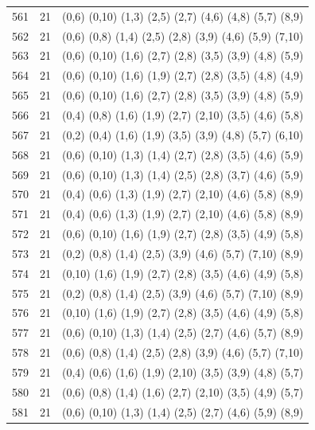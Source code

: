 \begin{appendix}
{\begin{longtable}{lll}
    561& 21 & (0,6)   (0,10)  (1,3)   (2,5)   (2,7)   (4,6)   (4,8)   (5,7)   (8,9)\\
    562& 21 & (0,6)   (0,8)   (1,4)   (2,5)   (2,8)   (3,9)   (4,6)   (5,9)   (7,10)\\
    563& 21 & (0,6)   (0,10)  (1,6)   (2,7)   (2,8)   (3,5)   (3,9)   (4,8)   (5,9)\\
    564& 21 & (0,6)   (0,10)  (1,6)   (1,9)   (2,7)   (2,8)   (3,5)   (4,8)   (4,9)\\
    565& 21 & (0,6)   (0,10)  (1,6)   (2,7)   (2,8)   (3,5)   (3,9)   (4,8)   (5,9)\\
    566& 21 & (0,4)   (0,8)   (1,6)   (1,9)   (2,7)   (2,10)  (3,5)   (4,6)   (5,8)\\
    567& 21 & (0,2)   (0,4)   (1,6)   (1,9)   (3,5)   (3,9)   (4,8)   (5,7)   (6,10)\\
    568& 21 & (0,6)   (0,10)  (1,3)   (1,4)   (2,7)   (2,8)   (3,5)   (4,6)   (5,9)\\
    569& 21 & (0,6)   (0,10)  (1,3)   (1,4)   (2,5)   (2,8)   (3,7)   (4,6)   (5,9)\\
    570& 21 & (0,4)   (0,6)   (1,3)   (1,9)   (2,7)   (2,10)  (4,6)   (5,8)   (8,9)\\
    571& 21 & (0,4)   (0,6)   (1,3)   (1,9)   (2,7)   (2,10)  (4,6)   (5,8)   (8,9)\\
    572& 21 & (0,6)   (0,10)  (1,6)   (1,9)   (2,7)   (2,8)   (3,5)   (4,9)   (5,8)\\
    573& 21 & (0,2)   (0,8)   (1,4)   (2,5)   (3,9)   (4,6)   (5,7)   (7,10)  (8,9)\\
    574& 21 & (0,10)  (1,6)   (1,9)   (2,7)   (2,8)   (3,5)   (4,6)   (4,9)   (5,8)\\
    575& 21 & (0,2)   (0,8)   (1,4)   (2,5)   (3,9)   (4,6)   (5,7)   (7,10)  (8,9)\\
    576& 21 & (0,10)  (1,6)   (1,9)   (2,7)   (2,8)   (3,5)   (4,6)   (4,9)   (5,8)\\
    577& 21 & (0,6)   (0,10)  (1,3)   (1,4)   (2,5)   (2,7)   (4,6)   (5,7)   (8,9)\\
    578& 21 & (0,6)   (0,8)   (1,4)   (2,5)   (2,8)   (3,9)   (4,6)   (5,7)   (7,10)\\
    579& 21 & (0,4)   (0,6)   (1,6)   (1,9)   (2,10)  (3,5)   (3,9)   (4,8)   (5,7)\\
    580& 21 & (0,6)   (0,8)   (1,4)   (1,6)   (2,7)   (2,10)  (3,5)   (4,9)   (5,7)\\
    581& 21 & (0,6)   (0,10)  (1,3)   (1,4)   (2,5)   (2,7)   (4,6)   (5,9)   (8,9)\\

\end{longtable}}
\end{appendix}
